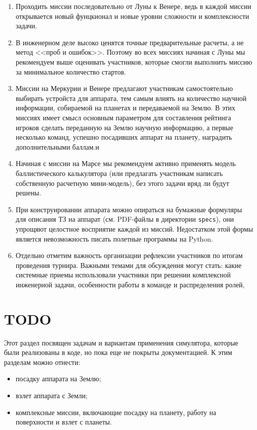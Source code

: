 \documentclass[12pt,a4paper]{article}
\begin{document}
\begin{enumerate}
  \item Проходить миссии последовательно от Луны к Венере, ведь в каждой миссии
    открывается новый фунцкионал и новые уровни сложности и комплексности задачи.
  \item В инженерном деле высоко ценятся точные предварительные расчеты, а не метод <<проб
    и ошибок>>. Поэтому во всех миссиях начиная с Луны мы рекомендуем выше оценивать
    участников, которые смогли выполнить миссию за минимальное количество стартов.
  \item Миссии на Меркурии и Венере предлагают участникам самостоятельно выбирать устройста
    для аппарата, тем самым влиять на количество научной информации, собираемой на
    планетах и передаваемой на Землю. В этих миссиях имеет смысл основным параметром для
    составления рейтинга игроков сделать переданную на Землю научную информацию, а первые
    несколько команд, успешно посадивших аппарат на планету, наградить дополнительными
    баллам.и
  \item Начиная с миссии на Марсе мы рекомендуем активно применять модель баллистического
    калькулятора (или предлагать участникам написать собственную расчетную мини-модель),
    без этого задачи вряд ли будут решены.
  \item При конструировании аппарата можно опираться на бумажные формуляры для описания ТЗ
    на аппарат (см. PDF-файлы в директории \verb'specs'), они упрощяют целостное
    восприятие каждой из миссий. Недостатком этой формы является невозможность писать
    полетные программы на Python.
  \item Отдельно отметим важность организации рефлексии участников по итогам проведения
    турнира. Важными темами для обсуждения могут стать: какие системные приемы
    использовали участники при решении комплексной инженерной задачи, особенности работы
    в команде и распределения ролей, 
\end{enumerate}

\section{TODO}

Этот раздел посвящен задачам и вариантам применения симулятора, которые были реализованы в
коде, но пока еще не покрыты документацией. К этим разделам можно отнести:

\begin{itemize}
\item посадку аппарата на Землю;
\item взлет аппарата с Земли;
\item комплексные миссии, включающие посадку на планету, работу на поверхности и взлет с планеты.
\end{itemize}
\end{document}
